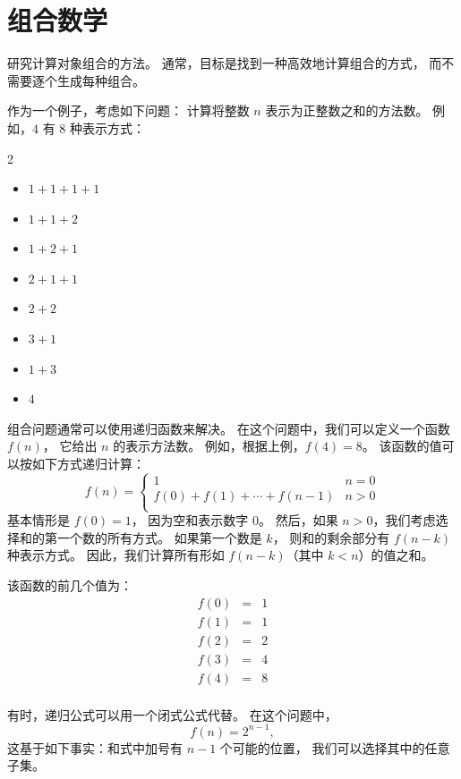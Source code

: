 \chapter{组合数学}


研究计算对象组合的方法。
通常，目标是找到一种高效地计算组合的方式，
而不需要逐个生成每种组合。

作为一个例子，考虑如下问题：
计算将整数 $n$ 表示为正整数之和的方法数。
例如，$4$ 有 8 种表示方式：
\begin{multicols}{2}
\begin{itemize}
\item $1+1+1+1$
\item $1+1+2$
\item $1+2+1$
\item $2+1+1$
\item $2+2$
\item $3+1$
\item $1+3$
\item $4$
\end{itemize}
\end{multicols}

组合问题通常可以使用递归函数来解决。
在这个问题中，我们可以定义一个函数 $f(n)$，
它给出 $n$ 的表示方法数。
例如，根据上例，$f(4)=8$。
该函数的值可以按如下方式递归计算：
\begin{equation*}
    f(n) = \begin{cases}
               1               & n = 0\\
               f(0)+f(1)+\cdots+f(n-1) & n > 0\\
           \end{cases}
\end{equation*}
基本情形是 $f(0)=1$，
因为空和表示数字 0。
然后，如果 $n>0$，我们考虑选择和的第一个数的所有方式。
如果第一个数是 $k$，
则和的剩余部分有 $f(n-k)$ 种表示方式。
因此，我们计算所有形如 $f(n-k)$（其中 $k<n$）的值之和。

该函数的前几个值为：
\[
\begin{array}{lcl}
f(0) & = & 1 \\
f(1) & = & 1 \\
f(2) & = & 2 \\
f(3) & = & 4 \\
f(4) & = & 8 \\
\end{array}
\]

有时，递归公式可以用一个闭式公式代替。
在这个问题中，
\[
f(n)=2^{n-1},
\]
这基于如下事实：和式中加号有 $n-1$ 个可能的位置，
我们可以选择其中的任意子集。

